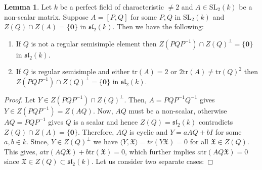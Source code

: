 \documentclass[10pt,twoside]{amsart}
\newcommand{\SL}{\mathrm{SL}}
\newcommand{\tr}{\mathrm{tr}}
\theoremstyle{definition}
\theoremstyle{definition}
\newtheorem{lemma}[theorem]{Lemma}
\begin{document}
\begin{lemma}{\label{fixed vector ortho compl}}
Let $k$ be a perfect field of characteristic $\neq 2$ and $A\in \SL_2(k)$ be a non-scalar matrix. Suppose $A=[P, Q]$ for some $P,Q$ in $\SL_2(k)$ and $Z(Q)\cap Z(A)=\{\mathbf{0\}}$ in $\mathfrak{sl}_2(k)$. Then we have the following: 
\begin{enumerate}
\item If $Q$ is not a regular semisimple element then $Z(PQP^{-1})\cap Z(Q)^{\perp}= \{\mathbf{0}\}$ in $\mathfrak{sl}_2(k)$. 
\item If $Q$ is regular semisimple and either $\tr(A)=2$ or
$2 \tr(A)\neq \tr(Q)^2$ then $Z(PQP^{-1})\cap Z(Q)^{\perp}=\{\mathbf{0}\}$ in $\mathfrak{sl}_2(k)$. 
\end{enumerate}
\end{lemma}
\begin{proof}
Let $Y\in Z(PQP^{-1})\cap Z(Q)^{\perp}$. Then, $A=PQP^{-1}Q^{-1}$ gives $Y\in Z(PQP^{-1})=Z(AQ) $.
Now, $AQ$ must be a non-scalar, otherwise $AQ=PQP^{-1}$ gives $Q$ is a scalar and hence $Z(Q)=\mathfrak{sl}_2(k)$ contradicts $Z(Q)\cap Z(A)=\{\mathbf{0\}}$. Therefore, $AQ$ is cyclic and $Y = a AQ + bI$ for some $a, b\in k$. Since,  $Y\in Z(Q)^{\perp}$ we have $\langle Y, \mathfrak{X}\rangle =  tr(Y\mathfrak X) =0$ for all $\mathfrak{X}\in Z(Q)$. This gives, $a\tr(AQ\mathfrak{X}) +b \tr(\mathfrak{X}) = 0$, which further implies $a\tr(AQ\mathfrak{X})=0$ since $\mathfrak{X}\in Z(Q) \subset \mathfrak{sl}_2(k)$. Let us consider two separate cases:
   

\end{proof}
\end{document}
